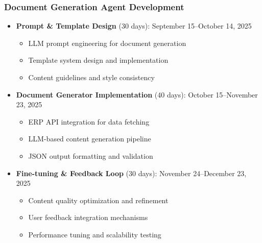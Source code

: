 \documentclass[12pt]{report}
\begin{document}
\subsubsection{Document Generation Agent Development}
\begin{itemize}
  \item \textbf{Prompt \& Template Design} (30 days): September 15--October 14, 2025
    \begin{itemize}
      \item LLM prompt engineering for document generation
      \item Template system design and implementation
      \item Content guidelines and style consistency
    \end{itemize}
  \item \textbf{Document Generator Implementation} (40 days): October 15--November 23, 2025
    \begin{itemize}
      \item ERP API integration for data fetching
      \item LLM-based content generation pipeline
      \item JSON output formatting and validation
    \end{itemize}
  \item \textbf{Fine-tuning \& Feedback Loop} (30 days): November 24--December 23, 2025
    \begin{itemize}
      \item Content quality optimization and refinement
      \item User feedback integration mechanisms
      \item Performance tuning and scalability testing
    \end{itemize}
\end{itemize}
\end{document}
